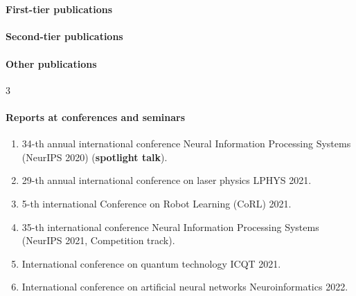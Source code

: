 \section*{}

\paragraph{First-tier publications} 
\begin{refsection} 
    \nocite{confbib1}
    \printbibliography[heading=none]
\end{refsection}

\paragraph{Second-tier publications}
\begin{refsection} 
    \nocite{confbib4}
    \printbibliography[heading=none]
\end{refsection}

\paragraph{Other publications}
\begin{refsection} 
    \nocite{confbib2}
    \nocite{confbib3}
    \nocite{progbib1_en}
    \printbibliography[heading=none]
\end{refsection}

\expandafter\def\csname blx@maxbibnames\endcsname{3}%

\paragraph{Reports at conferences and seminars}
\begin{enumerate}[labelindent=3pt, labelsep=10pt, topsep=10pt, itemsep=5pt]
    \item 34-th annual international conference Neural Information Processing Systems (NeurIPS 2020) (\textbf{spotlight talk}).
    \item 29-th annual international conference on laser physics LPHYS 2021.
    \item 5-th international Conference on Robot Learning (CoRL) 2021.
    \item 35-th international conference Neural Information Processing Systems (NeurIPS 2021, Competition track).
    \item International conference on quantum technology ICQT 2021.
    \item International conference on artificial neural networks Neuroinformatics 2022.
\end{enumerate}

